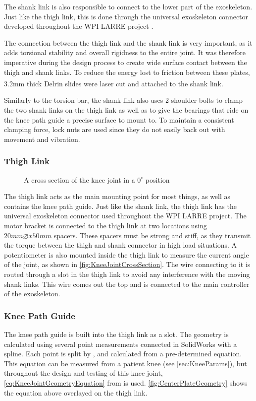 The shank link is also responsible to connect to the lower part of the exoskeleton. Just like the thigh link, this is done through the universal exoskeleton connector developed throughout the WPI LARRE project \cite{SpringWrapClutchKnee}.

The connection between the thigh link and the shank link is very important, as it adds torsional stability and overall rigidness to the entire joint. It was therefore imperative during the design process to create wide surface contact between the thigh and shank links. To reduce the energy lost to friction between these plates, 3.2mm thick Delrin\textsuperscript{\textregistered} slides were laser cut and attached to the shank link. 

Similarly to the torsion bar, the shank link also uses 2 shoulder bolts to clamp the two shank links on the thigh link as well as to give the bearings that ride on the knee path guide a precise surface to mount to. To maintain a consistent clamping force, lock nuts are used since they do not easily back out with movement and vibration. 

\subsubsection{Thigh Link}

\begin{figure}
    \centering
    \caption{A cross section of the knee joint in a \(0^\circ\) position}
    \label{fig:KneeJointCrossSection}
\end{figure}

The thigh link acts as the main mounting point for most things, as well as contains the knee path guide. Just like the shank link, the thigh link has the universal exoskeleton connector used throughout the WPI LARRE project. The motor bracket is connected to the thigh link at two locations using \(20mm\diameter x 50mm\) spacers. These spacers must be strong and stiff, as they transmit the torque between the thigh and shank connector in high load situations. A potentiometer is also mounted inside the thigh link to measure the current angle of the joint, as shown in \autoref{fig:KneeJointCrossSection}. The wire connecting to it is routed through a slot in the thigh link to avoid any interference with the moving shank links. This wire comes out the top and is connected to the main controller of the exoskeleton.

\subsubsection{Knee Path Guide}
The knee path guide is built into the thigh link as a slot. The geometry is calculated using several point measurements connected in SolidWorks with a spline. Each point is split by , and calculated from a pre-determined equation. This equation can be measured from a patient knee (see \autoref{sec:KneeParams}), but throughout the design and testing of this knee joint, \autoref{eq:KneeJointGeometryEquation} from \cite{KinDynKneeJoint} is used. \autoref{fig:CenterPlateGeometry} shows the equation above overlayed on the thigh link.


